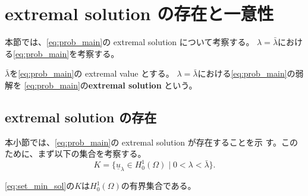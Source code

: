 \section{extremal solution の存在と一意性} \label{sec:extremal_sol}

本節では、\ref{eq:prob_main}の extremal solution について考察する。
$\lambda = \bar{\lambda}$における\ref{eq:prob_main}を考察する。

\begin{defn}
 $\bar{\lambda}$を\ref{eq:prob_main}の extremal value とする。
 $\lambda = \bar{\lambda}$における\ref{eq:prob_main}の弱解を
 \ref{eq:prob_main}の{\bf extremal solution }という。
\end{defn}

\subsection{extremal solution の存在}

本小節では、\ref{eq:prob_main}の extremal solution が存在することを示
す。このために、まず以下の集合を考察する。
\begin{equation}
 K = \{ \underline{u}_\lambda \in H_0^1(\Omega) \mid 0 < \lambda <
  \bar{\lambda} \}.
  \label{eq:set_min_sol}
\end{equation}

\begin{lem} \label{lem:set_min_sol}
 \eqref{eq:set_min_sol}の$K$は$H_0^1(\Omega)$の有界集合である。
\end{lem}

